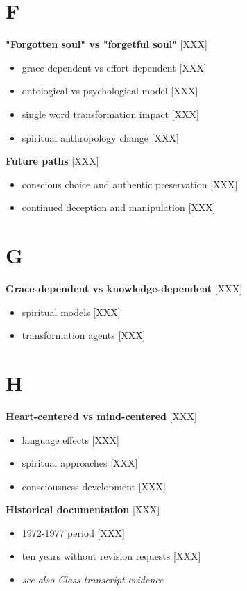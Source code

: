 \documentclass[11pt,twoside]{book}
\begin{document}
\section*{F}
\label{sec:orgadbdc9b}

\textbf{\textbf{"Forgotten soul" vs "forgetful soul"}} {[}XXX]
\begin{itemize}
\item grace-dependent vs effort-dependent [XXX]
\item ontological vs psychological model [XXX]
\item single word transformation impact [XXX]
\item spiritual anthropology change [XXX]
\end{itemize}

\textbf{\textbf{Future paths}} {[}XXX]
\begin{itemize}
\item conscious choice and authentic preservation [XXX]
\item continued deception and manipulation [XXX]
\end{itemize}
\section*{G}
\label{sec:org596ef89}

\textbf{\textbf{Grace-dependent vs knowledge-dependent}} {[}XXX]
\begin{itemize}
\item spiritual models [XXX]
\item transformation agents [XXX]
\end{itemize}
\section*{H}
\label{sec:orgb462f50}

\textbf{\textbf{Heart-centered vs mind-centered}} {[}XXX]
\begin{itemize}
\item language effects [XXX]
\item spiritual approaches [XXX]
\item consciousness development [XXX]
\end{itemize}

\textbf{\textbf{Historical documentation}} {[}XXX]
\begin{itemize}
\item 1972-1977 period [XXX]
\item ten years without revision requests [XXX]
\item \emph{see also Class transcript evidence}
\end{itemize}
\end{document}
